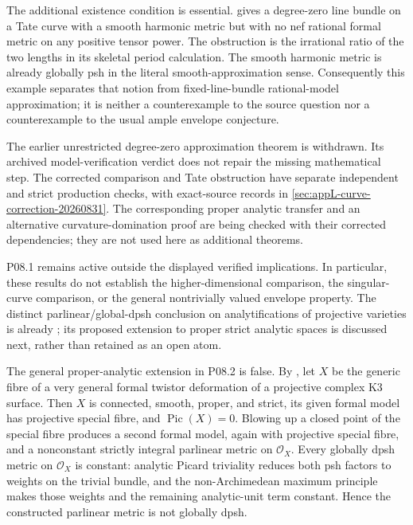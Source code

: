 The additional existence condition is essential.
 gives a degree-zero
line bundle on a Tate curve with a smooth harmonic metric but with no nef
rational formal metric on any positive tensor power.  The obstruction is
the irrational ratio of the two lengths in its skeletal period
calculation.  The smooth harmonic metric is already globally psh in the
literal smooth-approximation sense.  Consequently this example separates
that notion from fixed-line-bundle rational-model approximation; it is
neither a counterexample to the source question nor a counterexample to
the usual ample envelope conjecture.

The earlier unrestricted degree-zero approximation theorem is withdrawn.
Its archived model-verification verdict does not repair the missing
mathematical step.  The corrected comparison and Tate obstruction have
separate independent and strict production checks, with exact-source
records in \cref{sec:appL-curve-correction-20260831}.  The corresponding
proper analytic transfer and an alternative curvature-domination proof
are being checked with their corrected dependencies; they are not used
here as additional theorems.

P08.1 remains active outside the displayed verified implications.  In
particular, these results do not establish the higher-dimensional
comparison, the singular-curve comparison, or the general
nontrivially valued envelope property.  The distinct parlinear/global-dpsh
conclusion on analytifications of projective varieties is already
\cite[Corollary~17.8.9]{CLD25}; its proposed extension to proper strict
analytic spaces is discussed next, rather than retained as an open atom.

The general proper-analytic extension in P08.2 is false.  By
, let $X$ be the
generic fibre of a very general formal twistor deformation of a projective
complex K3 surface.  Then $X$ is connected, smooth, proper, and strict, its
given formal model has projective special fibre, and
$\operatorname{Pic}(X)=0$.  Blowing up a closed point of the special fibre
produces a second formal model, again with projective special fibre, and a
nonconstant strictly integral parlinear metric on $\mathcal O_X$.  Every
globally dpsh metric on $\mathcal O_X$ is constant: analytic Picard
triviality reduces both psh factors to weights on the trivial bundle, and
the non-Archimedean maximum principle makes those weights and the remaining
analytic-unit term constant.  Hence the constructed parlinear metric is not
globally dpsh.


